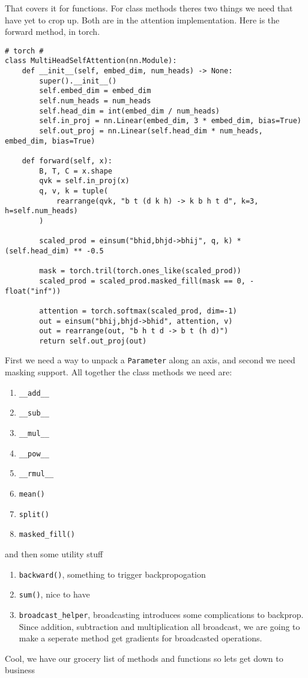 \documentclass[11pt]{article}
\begin{document}
That covers it for functions. For class methods theres two things we need that have yet to crop up. Both are in 
the attention implementation. Here is the forward method, in torch.
\begin{verbatim}
# torch # 
class MultiHeadSelfAttention(nn.Module):
    def __init__(self, embed_dim, num_heads) -> None:
        super().__init__()
        self.embed_dim = embed_dim
        self.num_heads = num_heads
        self.head_dim = int(embed_dim / num_heads)
        self.in_proj = nn.Linear(embed_dim, 3 * embed_dim, bias=True)
        self.out_proj = nn.Linear(self.head_dim * num_heads, embed_dim, bias=True)

    def forward(self, x):
        B, T, C = x.shape
        qvk = self.in_proj(x)
        q, v, k = tuple(
            rearrange(qvk, "b t (d k h) -> k b h t d", k=3, h=self.num_heads)
        )

        scaled_prod = einsum("bhid,bhjd->bhij", q, k) * (self.head_dim) ** -0.5

        mask = torch.tril(torch.ones_like(scaled_prod))
        scaled_prod = scaled_prod.masked_fill(mask == 0, -float("inf"))

        attention = torch.softmax(scaled_prod, dim=-1)
        out = einsum("bhij,bhjd->bhid", attention, v)
        out = rearrange(out, "b h t d -> b t (h d)")
        return self.out_proj(out)
\end{verbatim}
First we need a way to unpack a \texttt{Parameter} along an axis, and second we need masking support. All together
the class methods we need are:
\begin{enumerate}
  \item \texttt{\_\_add\_\_}
  \item \texttt{\_\_sub\_\_}
  \item \texttt{\_\_mul\_\_}
  \item \texttt{\_\_pow\_\_}
  \item \texttt{\_\_rmul\_\_}
  \item \texttt{mean()}
  \item \texttt{split()}
  \item \texttt{masked\_fill()}
\end{enumerate}
and then some utility stuff
\begin{enumerate}[resume]
  \item \texttt{backward()}, something to trigger backpropogation 
  \item \texttt{sum()}, nice to have
  \item \texttt{broadcast\_helper}, broadcasting introduces some complications to backprop. Since addition, subtraction
    and multiplication all broadcast, we are going to make a seperate method get gradients for broadcasted operations.
\end{enumerate}
Cool, we have our grocery list of methods and functions so lets get down to business
\end{document}
